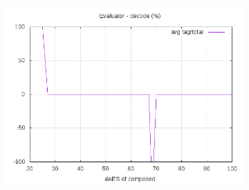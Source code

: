\documentclass[10pt,a4paper]{article}
\begin{document}
\begin{figure}[h]
\begin{subfigure}[t]{0.3\textwidth}
        \includegraphics[width=\textwidth]{eval_decode_frac}
        \caption{}
    \end{subfigure}
\end{figure}
\end{document}
